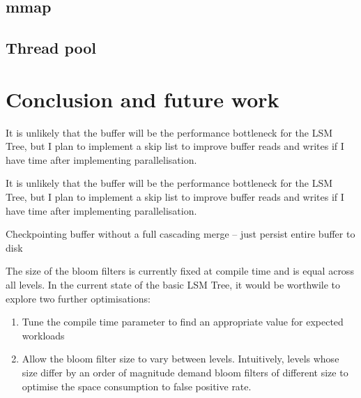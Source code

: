 \documentclass{acm}
\begin{document}
\subsection{mmap}

\subsection{Thread pool}


\section{Conclusion and future work}

It is unlikely that the buffer will be the performance bottleneck for the LSM Tree, but I plan to implement a skip list to improve buffer reads and writes if I have time after implementing parallelisation.

It is unlikely that the buffer will be the performance bottleneck for the LSM Tree, but I plan to implement a skip list to improve buffer reads and writes if I have time after implementing parallelisation.

Checkpointing buffer without a full cascading merge -- just persist entire buffer to disk

The size of the bloom filters is currently fixed at compile time and is equal across all levels. In the current state of the basic LSM Tree, it would be worthwile to explore two further optimisations:

\begin{enumerate}
  \item Tune the compile time parameter to find an appropriate value for expected workloads
  \item Allow the bloom filter size to vary between levels. Intuitively, levels whose size differ by an order of magnitude demand bloom filters of different size to optimise the space consumption to false positive rate.
\end{enumerate}
\end{document}
